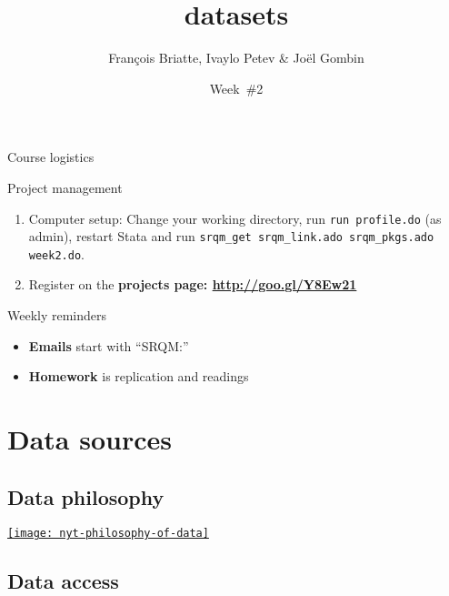 \documentclass[t]{beamer}
\title{datasets}
\author{François Briatte, Ivaylo Petev \& Joël Gombin}
\date{Week~\#2}
\begin{document}

	\begin{frame}[t]{Course logistics}

    \begin{block}{Project management}
      \begin{enumerate}
        \item Computer setup: Change your working directory, run \texttt{run profile.do} (as admin), restart Stata and run \texttt{srqm\_get srqm\_link.ado srqm\_pkgs.ado week2.do}.
        \item Register on the \textbf{projects page: \url{http://goo.gl/Y8Ew21}}
      \end{enumerate}
    \end{block}

    \begin{alertblock}{Weekly reminders}
      \begin{itemize}
	       \item \textbf{Emails} start with ``SRQM:''
	       \item \textbf{Homework} is replication and readings
      \end{itemize}
    \end{alertblock}
	\end{frame}
  
  \section{Data sources}

  \subsection{Data philosophy}
  
  \begin{frame}[c, plain]
  
		\href{http://nyti.ms/XSZMFX}%
			{\texttt{[image: nyt-philosophy-of-data]}}	

  \end{frame}    

  \subsection{Data access}
	
\end{document}
